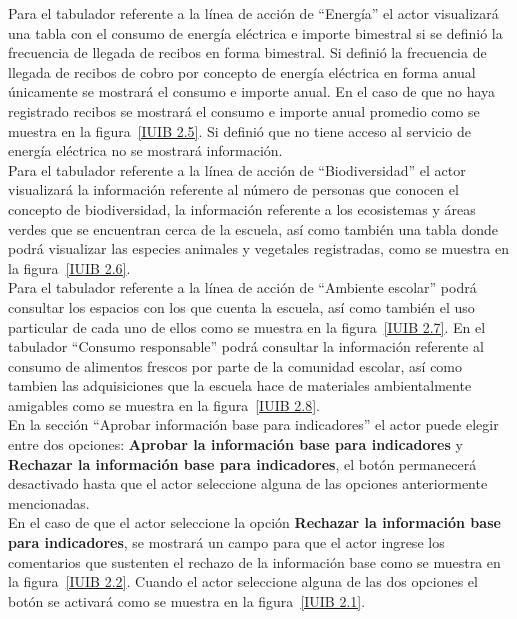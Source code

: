       Para el tabulador referente a la línea de acción de ``Energía'' el actor visualizará una tabla con el consumo de energía eléctrica e importe bimestral si se definió la frecuencia de llegada de recibos en forma bimestral. Si definió la frecuencia de llegada de recibos de cobro por concepto de energía eléctrica en forma anual únicamente se mostrará el consumo e importe anual. En el caso de que no haya registrado recibos se mostrará el consumo e importe anual promedio como se muestra en la figura~\ref{IUIB 2.5}. Si definió que no tiene acceso al servicio de energía eléctrica no se mostrará información.\\
    
      Para el tabulador referente a la línea de acción de ``Biodiversidad'' el actor visualizará la información referente al número de personas que conocen el concepto de biodiversidad, la información referente a los ecosistemas y áreas verdes que se encuentran cerca de la escuela, así como también una tabla donde podrá visualizar las especies animales y vegetales registradas, como se muestra en la figura~\ref{IUIB 2.6}.\\
      
      Para el tabulador referente a la línea de acción de ``Ambiente escolar'' podrá consultar los espacios con los que cuenta la escuela, así como también el uso particular de cada uno de ellos como se muestra en la figura~\ref{IUIB 2.7}. En el tabulador ``Consumo responsable'' podrá consultar la información referente al consumo de alimentos frescos por parte de la comunidad escolar, así como tambien las adquisiciones que la escuela hace de materiales ambientalmente amigables como se muestra en la figura~\ref{IUIB 2.8}.\\
      
      En la sección ``Aprobar información base para indicadores'' el actor puede elegir entre dos opciones: {\bf Aprobar la información base para indicadores} y {\bf Rechazar la información base para indicadores}, el botón  permanecerá desactivado hasta que el actor seleccione alguna de las opciones anteriormente mencionadas.\\
      
      En el caso de que el actor seleccione la opción {\bf Rechazar la información base para indicadores}, se mostrará un campo para que el actor ingrese los comentarios que sustenten el rechazo de la información base como se muestra en la figura~\ref{IUIB 2.2}. Cuando el actor seleccione alguna de las dos opciones el botón  se activará como se muestra en la figura~\ref{IUIB 2.1}.\\
      
